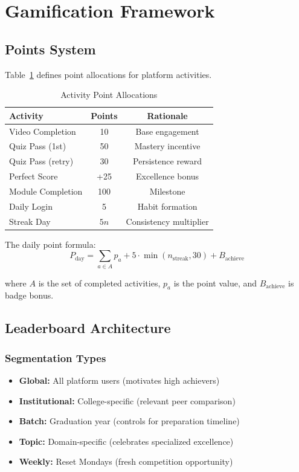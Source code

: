 \documentclass[journal]{IEEEtran}
\begin{document}
\section{Gamification Framework}
\label{sec:gamification}

\subsection{Points System}

Table~\ref{tab:points} defines point allocations for platform activities.

\begin{table}[htbp]
\caption{Activity Point Allocations}
\label{tab:points}
\centering
\begin{tabular}{lcc}
\toprule
\textbf{Activity} & \textbf{Points} & \textbf{Rationale} \\
\midrule
Video Completion & 10 & Base engagement \\
Quiz Pass (1st) & 50 & Mastery incentive \\
Quiz Pass (retry) & 30 & Persistence reward \\
Perfect Score & +25 & Excellence bonus \\
Module Completion & 100 & Milestone \\
Daily Login & 5 & Habit formation \\
Streak Day & $5n$ & Consistency multiplier \\
\bottomrule
\end{tabular}
\end{table}

The daily point formula:
\begin{equation}
P_{\text{day}} = \sum_{a \in A} p_a + 5 \cdot \min(n_{\text{streak}}, 30) + B_{\text{achieve}}
\end{equation}

where $A$ is the set of completed activities, $p_a$ is the point value, and $B_{\text{achieve}}$ is badge bonus.

\subsection{Leaderboard Architecture}

\subsubsection{Segmentation Types}
\begin{itemize}
    \item \textbf{Global:} All platform users (motivates high achievers)
    \item \textbf{Institutional:} College-specific (relevant peer comparison)
    \item \textbf{Batch:} Graduation year (controls for preparation timeline)
    \item \textbf{Topic:} Domain-specific (celebrates specialized excellence)
    \item \textbf{Weekly:} Reset Mondays (fresh competition opportunity)
\end{itemize}
\end{document}
